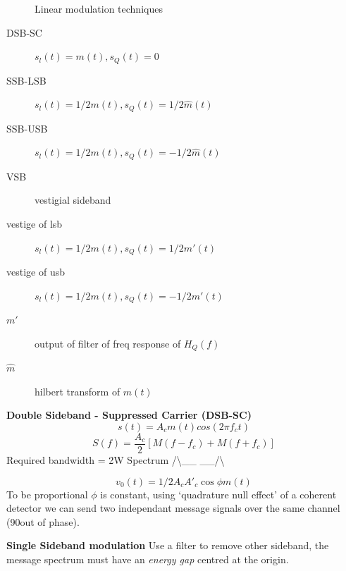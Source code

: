 \begin{description}
\item[] Linear modulation techniques
\item[DSB-SC] $s_l(t) = m(t) , s_Q(t) = 0$
\item[SSB-LSB] $s_l(t) = 1/2 m(t) , s_Q(t) = 1/2\hat m(t)$
\item[SSB-USB]$s_l(t) = 1/2 m(t) , s_Q(t) = - 1/2\hat m(t)$
\item[VSB] vestigial sideband
\item[vestige of lsb]$s_l(t) = 1/2 m(t) , s_Q(t) =  1/2m'(t)$
\item[vestige of usb]$s_l(t) = 1/2 m(t) , s_Q(t) = - 1/2m'(t)$
\item[$m'$] output of filter of freq response of $H_Q(f)$
\item[$\hat m$] hilbert transform of $m(t)$
\end{description}

\textbf{Double Sideband - Suppressed Carrier (DSB-SC)}
\[s(t) = A_c m(t) cos(2\pi f_c t)\]
\[S(f) = \frac{A_c}{2}[M(f-f_c)+M(f+f_c)]\]
Required bandwidth = 2W
Spectrum  /\textbackslash \_\_ \textbar \_\_/\textbackslash

\[v_0(t) = 1/2 A_cA'_c \cos \phi m(t)\]
To be proportional $\phi$ is constant, using `quadrature null effect' of a
coherent detector we can send two independant message signals over the same
channel (90\textdegree out of phase).

\textbf{Single Sideband modulation}
Use a filter to remove other sideband, the message spectrum must have an
\emph{energy gap} centred at the origin.


